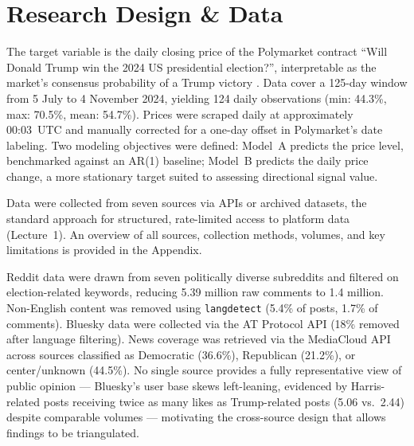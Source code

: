 \section{Research Design \& Data}

The target variable is the daily closing price of the Polymarket contract ``Will Donald Trump win the 2024 US presidential election?'', interpretable as the market's consensus probability of a Trump victory \citep{manski2006}. Data cover a 125-day window from 5 July to 4 November 2024, yielding 124 daily observations (min: 44.3\%, max: 70.5\%, mean: 54.7\%). Prices were scraped daily at approximately 00:03~UTC and manually corrected for a one-day offset in Polymarket's date labeling. Two modeling objectives were defined: Model~A predicts the price level, benchmarked against an AR(1) baseline; Model~B predicts the daily price change, a more stationary target suited to assessing directional signal value.

Data were collected from seven sources via APIs or archived datasets, the standard approach for structured, rate-limited access to platform data (Lecture~1). An overview of all sources, collection methods, volumes, and key limitations is provided in the Appendix.

Reddit data were drawn from seven politically diverse subreddits and filtered on election-related keywords, reducing 5.39 million raw comments to 1.4 million. Non-English content was removed using \texttt{langdetect} (5.4\% of posts, 1.7\% of comments). Bluesky data were collected via the AT Protocol API (18\% removed after language filtering). News coverage was retrieved via the MediaCloud API across sources classified as Democratic (36.6\%), Republican (21.2\%), or center/unknown (44.5\%). No single source provides a fully representative view of public opinion --- Bluesky's user base skews left-leaning, evidenced by Harris-related posts receiving twice as many likes as Trump-related posts (5.06 vs.\ 2.44) despite comparable volumes --- motivating the cross-source design that allows findings to be triangulated.
